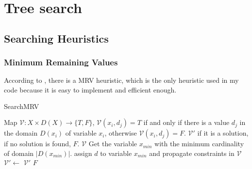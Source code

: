 \documentclass[a4paper, 12pt]{report}
\begin{document}
\chapter {Tree search}

    \section {Searching Heuristics}
        \subsection {Minimum Remaining Values}
            According to \cite{golomb1965backtrack}, there is a MRV heuristic, which is the only heuristic used in my code because it is easy to implement and efficient enough.
            \begin{algorithm}
                \caption{SearchMRV}
                \label{MRV}
                \begin{algorithmic}[1]
                    \Require Map $\mathcal V:X\times D(X) \to \{T,F\}$, $\mathcal V(x_i,d_j)=T$ if and only if there is a value $d_j$ in the domain $D(x_i)$ of variable $x_i$, otherwise $\mathcal V(x_i,d_j)=F$. 
                    \Ensure $\mathcal V'$ if it is a solution, if no solution is found, $F$.
                            \State \Return $\mathcal V$
                        \EndIf
                        \State Get the variable $x_{min}$ with the minimum cardinality of domain $|D(x_{min})|$.
                            \State assign $d$ to variable $x_{min}$ and propagate constraints in $\mathcal V$
                                \State $\mathcal V'\leftarrow$ 
                                    \State \Return $\mathcal V'$
                                \EndIf
                            \EndIf
                        \EndFor
                        \State \Return $F$
                    \EndFunction
                \end{algorithmic}
            \end{algorithm}
\end{document}
